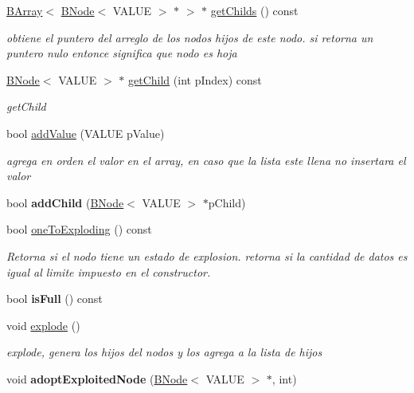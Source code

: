 \begin{DoxyCompactItemize}
\item 
\hyperlink{classBArray}{B\-Array}$<$ \hyperlink{classBNode}{B\-Node}$<$ V\-A\-L\-U\-E $>$ $\ast$ $>$ $\ast$ \hyperlink{classBNode_ab8bf944d82b64503fd9fb6c290f7511b}{get\-Childs} () const 
\begin{DoxyCompactList}\small\item\em obtiene el puntero del arreglo de los nodos hijos de este nodo. si retorna un puntero nulo entonce significa que nodo es hoja \end{DoxyCompactList}\item 
\hyperlink{classBNode}{B\-Node}$<$ V\-A\-L\-U\-E $>$ $\ast$ \hyperlink{classBNode_abde3468d7b1d49d1f858ce40eee6836c}{get\-Child} (int p\-Index) const 
\begin{DoxyCompactList}\small\item\em get\-Child \end{DoxyCompactList}\item 
bool \hyperlink{classBNode_aef1d184c4aeb9d85705b8917ed8e21ae}{add\-Value} (V\-A\-L\-U\-E p\-Value)
\begin{DoxyCompactList}\small\item\em agrega en orden el valor en el array, en caso que la lista este llena no insertara el valor \end{DoxyCompactList}\item 
\hypertarget{classBNode_a99214c44d2dcffbc289354d58e1aebbc}{bool {\bfseries add\-Child} (\hyperlink{classBNode}{B\-Node}$<$ V\-A\-L\-U\-E $>$ $\ast$p\-Child)}\label{classBNode_a99214c44d2dcffbc289354d58e1aebbc}

\item 
bool \hyperlink{classBNode_a6df6391831a91e15dbfaa406c48e9e43}{one\-To\-Exploding} () const 
\begin{DoxyCompactList}\small\item\em Retorna si el nodo tiene un estado de explosion. retorna si la cantidad de datos es igual al limite impuesto en el constructor. \end{DoxyCompactList}\item 
\hypertarget{classBNode_a8ad39a00cd1027aaad73c0685e280154}{bool {\bfseries is\-Full} () const }\label{classBNode_a8ad39a00cd1027aaad73c0685e280154}

\item 
void \hyperlink{classBNode_aa88f967e8ec0998fb5ee95daf95fb5af}{explode} ()
\begin{DoxyCompactList}\small\item\em explode, genera los hijos del nodos y los agrega a la lista de hijos \end{DoxyCompactList}\item 
\hypertarget{classBNode_acef7927774633486b47a96f938ea32da}{void {\bfseries adopt\-Exploited\-Node} (\hyperlink{classBNode}{B\-Node}$<$ V\-A\-L\-U\-E $>$ $\ast$, int)}\label{classBNode_acef7927774633486b47a96f938ea32da}


\end{DoxyCompactItemize}
